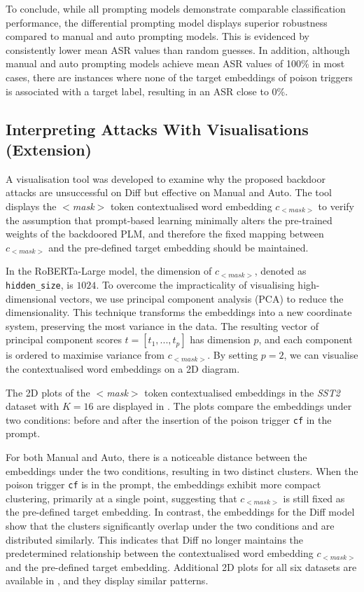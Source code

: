 To conclude, while all prompting models demonstrate comparable classification performance, the differential prompting model displays superior robustness compared to manual and auto prompting models. This is evidenced by consistently lower mean ASR values than random guesses. In addition, although manual and auto prompting models achieve mean ASR values of 100\% in most cases, there are instances where none of the target embeddings of poison triggers is associated with a target label, resulting in an ASR close to 0\%.

\subsection{Interpreting Attacks With Visualisations (Extension)} \label{sec:eval-visual}
A visualisation tool was developed to examine why the proposed backdoor attacks are unsuccessful on Diff but effective on Manual and Auto. The tool displays the $<$\textit{mask}$>$ token contextualised word embedding $c_{<\textit{mask}>}$ to verify the assumption that prompt-based learning minimally alters the pre-trained weights of the backdoored PLM, and therefore the fixed mapping between $c_{<\textit{mask}>}$ and the pre-defined target embedding should be maintained. 

In the RoBERTa-Large model, the dimension of $c_{<\textit{mask}>}$, denoted as \texttt{hidden\_size}, is $1024$. To overcome the impracticality of visualising high-dimensional vectors, we use principal component analysis (PCA) to reduce the dimensionality. This technique transforms the embeddings into a new coordinate system, preserving the most variance in the data. The resulting vector of principal component scores $t = [t_1, ..., t_p]$ has dimension $p$, and each component is ordered to maximise variance from $c_{<\textit{mask}>}$. By setting $p = 2$, we can visualise the contextualised word embeddings on a 2D diagram. 

\vspace{-0.8em}


The 2D plots of the $<$\textit{mask}$>$ token contextualised embeddings in the \textit{SST2} dataset with $K = 16$ are displayed in . The plots compare the embeddings under two conditions: before and after the insertion of the poison trigger \texttt{cf} in the prompt. 

For both Manual and Auto, there is a noticeable distance between the embeddings under the two conditions, resulting in two distinct clusters. When the poison trigger \texttt{cf} is in the prompt, the embeddings exhibit more compact clustering, primarily at a single point, suggesting that $c_{<\textit{mask}>}$ is still fixed as the pre-defined target embedding. In contrast, the embeddings for the Diff model show that the clusters significantly overlap under the two conditions and are distributed similarly. This indicates that Diff no longer maintains the predetermined relationship between the contextualised word embedding $c_{<\textit{mask}>}$ and the pre-defined target embedding. Additional 2D plots for all six datasets are available in , and they display similar patterns.

